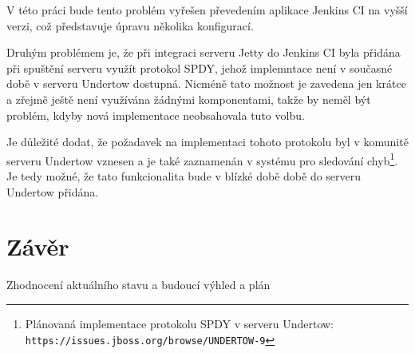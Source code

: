             V této práci bude tento problém vyřešen převedením aplikace Jenkins CI na vyšší verzi,
            což představuje úpravu několika konfigurací.

            \medskip        
            Druhým problémem je, že při integraci serveru Jetty do Jenkins CI byla přidána
            při spuštění serveru využít protokol SPDY, jehož implemntace
            není v současné době v serveru Undertow dostupná. Nicméně tato možnost
            je zavedena jen krátce a zřejmě ještě není využívána žádnými komponentami,
            takže by neměl být problém, kdyby nová implementace neobsahovala tuto volbu.
            
            Je důležité dodat, že požadavek na implementaci tohoto 
            protokolu byl v komunitě serveru Undertow vznesen
            a je také zaznamenán v systému pro sledování chyb\footnote{
                Plánovaná implementace protokolu SPDY v serveru Undertow:
                \texttt{https://issues.jboss.org/browse/UNDERTOW-9}}.
            Je tedy možné, že tato funkcionalita bude v blízké době době do serveru
            Undertow přidána.
            





\chapter{Závěr}
    Zhodnocení aktuálního stavu a budoucí výhled a plán





